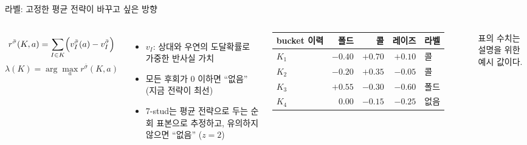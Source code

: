 \documentclass[aspectratio=169,11pt]{beamer}
\newcommand{\sigmabar}{\bar\sigma}
\begin{document}
\begin{frame}{라벨: 고정한 평균 전략이 바꾸고 싶은 방향}
\begin{columns}[T,onlytextwidth]
\[
r^{\sigmabar}(K,a)=\sum_{I\in K}\Bigl(v^{\sigmabar}_I(a)-v^{\sigmabar}_I\Bigr)
\]
\[
\lambda(K)=\arg\max_a r^{\sigmabar}(K,a)
\]
\small
\begin{itemize}
\item $v_I$: 상대와 우연의 도달확률로 가중한 반사실 가치
\item 모든 후회가 $0$ 이하면 “없음” (지금 전략이 최선)
\item 7-stud는 평균 전략으로 두는 순회 표본으로 추정하고, 유의하지 않으면 “없음” ($z=2$)
\end{itemize}
\vspace{4pt}
\centering\footnotesize\setlength{\tabcolsep}{4pt}
\begin{tabular}{lrrrl}
\toprule
bucket 이력 & 폴드 & 콜 & 레이즈 & 라벨\\
\midrule
$K_1$ & $-0.40$ & $+0.70$ & $+0.10$ & \textcolor{deepblue}{콜}\\
$K_2$ & $-0.20$ & $+0.35$ & $-0.05$ & \textcolor{deepblue}{콜}\\
$K_3$ & $+0.55$ & $-0.30$ & $-0.60$ & \textcolor{deeporange}{폴드}\\
$K_4$ & $0.00$ & $-0.15$ & $-0.25$ & \textcolor{muted}{없음}\\
\bottomrule
\end{tabular}

\vspace{4pt}
{\scriptsize\color{muted} 표의 수치는 설명을 위한 예시 값이다.}
\end{columns}
\end{frame}
\end{document}
